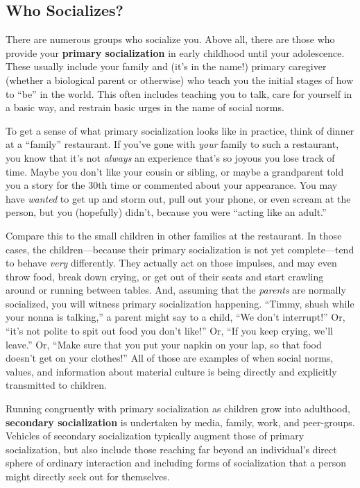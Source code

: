 \documentclass[
  letterpaper,
  DIV=11,
  numbers=noendperiod,
  oneside]{scrartcl}
\begin{document}
\subsection{Who Socializes?}\label{who-socializes}

There are numerous groups who socialize you. Above all, there are those
who provide your \textbf{primary socialization} in early childhood until
your adolescence. These usually include your family and (it's in the
name!) primary caregiver (whether a biological parent or otherwise) who
teach you the initial stages of how to ``be'' in the world. This often
includes teaching you to talk, care for yourself in a basic
way, and restrain basic
urges in the name of social norms.

To get a sense of what primary socialization looks like in practice,
think of dinner at a ``family'' restaurant. If you've gone with
\emph{your} family to such a restaurant, you know that it's not
\emph{always} an experience that's so joyous you lose track of time.
Maybe you don't like your cousin or sibling, or maybe a grandparent told
you a story for the 30th time or commented about your appearance. You
may have \emph{wanted} to get up and storm out, pull out your phone, or
even scream at the person, but you (hopefully) didn't, because you were
``acting like an adult.''

Compare this to the small children in other families at the
restaurant. In those cases, the children---because their
primary socialization is not yet complete---tend to behave \emph{very}
differently. They actually act on those impulses, and may even throw
food, break down crying, or get out of their seats and start crawling
around or running between tables. And, assuming that the \emph{parents}
are normally socialized, you will witness primary socialization
happening. ``Timmy, shush while your nonna is talking,'' a parent might
say to a child, ``We don't interrupt!'' Or, ``it's not polite to spit
out food you don't like!'' Or, ``If you keep crying, we'll leave.'' Or,
``Make sure that you put your napkin on your lap, so that food doesn't
get on your clothes!'' All of those are examples of when social norms,
values, and information about material culture is being directly and
explicitly transmitted to children.

Running congruently with primary socialization as children grow into
adulthood, \textbf{secondary socialization} is undertaken by media,
family, work, and peer-groups. Vehicles of secondary socialization
typically augment those of primary socialization, but also include those
reaching far beyond an individual's direct sphere of ordinary
interaction and including forms of socialization that a person might
directly seek out for themselves.
\end{document}
